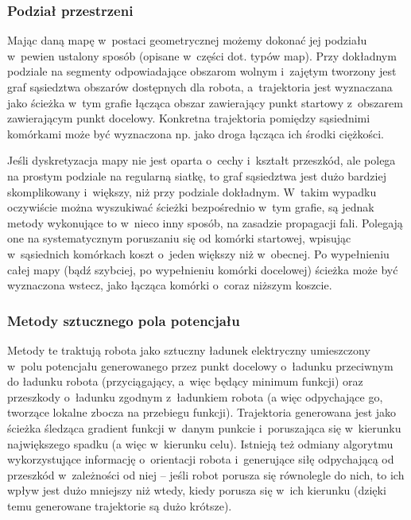 \subsubsection{Podział przestrzeni}

Mając daną mapę w~postaci geometrycznej możemy dokonać jej podziału w~pewien ustalony
sposób (opisane w~części dot. typów map). Przy dokładnym podziale na segmenty
odpowiadające obszarom wolnym i~zajętym tworzony jest graf sąsiedztwa obszarów dostępnych
dla robota, a~trajektoria jest wyznaczana jako ścieżka w~tym grafie łącząca obszar
zawierający punkt startowy z~obszarem zawierającym punkt docelowy. Konkretna trajektoria
pomiędzy sąsiednimi komórkami może być wyznaczona np. jako droga łącząca ich środki ciężkości.

Jeśli dyskretyzacja mapy nie jest oparta o~cechy i~kształt przeszkód, ale polega na
prostym podziale na regularną siatkę, to graf sąsiedztwa jest dużo bardziej skomplikowany
i~większy, niż przy podziale dokładnym. W~takim wypadku oczywiście można wyszukiwać
ścieżki bezpośrednio w~tym grafie, są jednak metody wykonujące to w~nieco inny sposób,
na zasadzie propagacji fali. Polegają one na systematycznym poruszaniu się
od komórki startowej, wpisując w~sąsiednich komórkach koszt o~jeden większy niż w~obecnej.
Po wypełnieniu całej mapy (bądź szybciej, po wypełnieniu komórki docelowej) ścieżka
może być wyznaczona wstecz, jako łącząca komórki o~coraz niższym koszcie.

\subsubsection{Metody sztucznego pola potencjału}

Metody te traktują robota jako sztuczny ładunek elektryczny umieszczony w~polu potencjału
generowanego przez punkt docelowy o~ładunku przeciwnym do ładunku robota
(przyciągający, a~więc będący minimum funkcji) oraz przeszkody o~ładunku zgodnym
z~ładunkiem robota (a więc odpychające go, tworzące lokalne zbocza na przebiegu funkcji).
Trajektoria generowana jest jako ścieżka śledząca gradient funkcji w~danym punkcie
i~poruszająca się w~kierunku największego spadku (a więc w~kierunku celu). Istnieją
też odmiany algorytmu wykorzystujące informację o~orientacji robota i~generujące
siłę odpychającą od przeszkód w~zależności od niej -- jeśli robot porusza się równolegle
do nich, to ich wpływ jest dużo mniejszy niż wtedy, kiedy porusza się w~ich kierunku
(dzięki temu generowane trajektorie są dużo krótsze).

